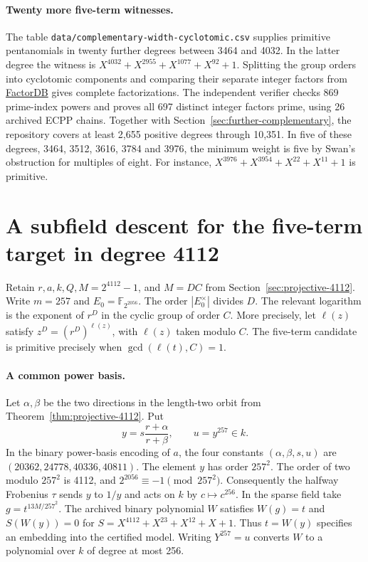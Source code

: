 \documentclass[11pt]{article}
\begin{document}
\paragraph{Twenty more five-term witnesses.}
The table \nolinkurl{data/complementary-width-cyclotomic.csv}
supplies primitive pentanomials in twenty further degrees between
3464 and 4032. In the latter degree the witness is
\(X^{4032}+X^{2955}+X^{1077}+X^{92}+1\).
Splitting the group orders into cyclotomic components and comparing
their separate integer factors from \href{https://factordb.com/}{FactorDB}
gives complete factorizations. The independent verifier checks 869
prime-index powers and proves all 697 distinct integer factors prime,
using 26 archived ECPP chains. Together with
Section~\ref{sec:further-complementary}, the repository covers at
least 2,655 positive degrees through 10,351. In five of these degrees,
3464, 3512, 3616, 3784 and 3976, the minimum weight is five by
Swan's obstruction for multiples of eight. For instance,
\(X^{3976}+X^{3954}+X^{22}+X^{11}+1\) is primitive.

\section{A subfield descent for the five-term target in degree 4112}
\label{sec:4112-descent}

Retain \(r,a,k,Q,M=2^{4112}-1\), and \(M=DC\) from
Section~\ref{sec:projective-4112}. Write \(m=257\) and
\(E_0=\mathbb F_{2^{2056}}\). The order \(|E_0^\times|\) divides \(D\).
The relevant logarithm is the exponent of \(r^D\) in the cyclic
group of order \(C\). More precisely, let \(\ell(z)\) satisfy
\(z^D=(r^D)^{\ell(z)}\), with \(\ell(z)\) taken modulo \(C\).
The five-term candidate is primitive precisely when
\(\gcd(\ell(t),C)=1\).

\paragraph{A common power basis.}
Let \(\alpha,\beta\) be the two directions in the length-two orbit
from Theorem~\ref{thm:projective-4112}. Put
\[
 y=s\frac{r+\alpha}{r+\beta},\qquad u=y^{257}\in k.
\]
In the binary power-basis encoding of \(a\), the four constants
\((\alpha,\beta,s,u)\) are \((20362,24778,40336,40811)\).
The element \(y\) has order \(257^2\). The order of two modulo
\(257^2\) is 4112, and \(2^{2056}\equiv-1\pmod{257^2}\).
Consequently the halfway Frobenius \(\tau\) sends \(y\) to \(1/y\)
and acts on \(k\) by \(c\mapsto c^{256}\). In the sparse field take
\(g=t^{13M/257^2}\). The archived binary polynomial \(W\) satisfies
\(W(g)=t\) and \(S(W(y))=0\) for \(S=X^{4112}+X^{23}+X^{12}+X+1\).
Thus \(t=W(y)\) specifies an embedding into the certified model.
Writing \(Y^{257}=u\) converts \(W\) to a polynomial over \(k\)
of degree at most 256.
\end{document}
